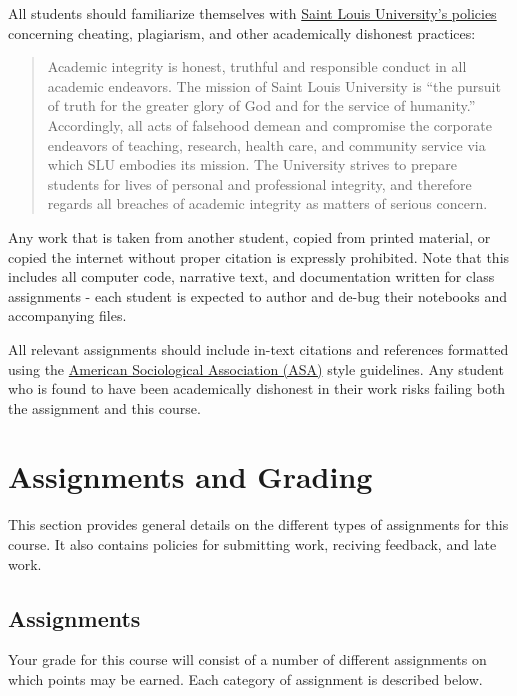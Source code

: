 \documentclass[]{book}
\theoremstyle{definition}
\theoremstyle{definition}
\theoremstyle{definition}
\theoremstyle{remark}
\begin{document}
All students should familiarize themselves with
\href{http://www.slu.edu/Documents/provost/academic_affairs/Academic\%20Integrity\%20Policy\%20FINAL\%20\%206-26-15.pd}{Saint
Louis University's policies} concerning cheating, plagiarism, and other
academically dishonest practices:

\begin{quote}
Academic integrity is honest, truthful and responsible conduct in all
academic endeavors. The mission of Saint Louis University is ``the
pursuit of truth for the greater glory of God and for the service of
humanity.'' Accordingly, all acts of falsehood demean and compromise the
corporate endeavors of teaching, research, health care, and community
service via which SLU embodies its mission. The University strives to
prepare students for lives of personal and professional integrity, and
therefore regards all breaches of academic integrity as matters of
serious concern.
\end{quote}

Any work that is taken from another student, copied from printed
material, or copied the internet without proper citation is expressly
prohibited. Note that this includes all computer code, narrative text,
and documentation written for class assignments - each student is
expected to author and de-bug their notebooks and accompanying files.

All relevant assignments should include in-text citations and references
formatted using the
\href{https://owl.english.purdue.edu/owl/resource/583/1/}{American
Sociological Association (ASA)} style guidelines. Any student who is
found to have been academically dishonest in their work risks failing
both the assignment and this course.

\hypertarget{assignments-and-grading}{%
\chapter{Assignments and Grading}\label{assignments-and-grading}}

This section provides general details on the different types of
assignments for this course. It also contains policies for submitting
work, reciving feedback, and late work.

\hypertarget{assignments}{%
\section{Assignments}\label{assignments}}

Your grade for this course will consist of a number of different
assignments on which points may be earned. Each category of assignment
is described below.
\end{document}
